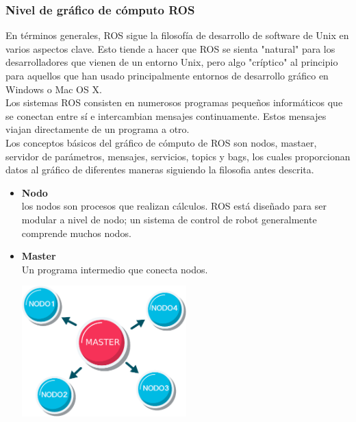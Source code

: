 \subsubsection{Nivel de gráfico de cómputo ROS}
En términos generales, ROS sigue la filosofía de desarrollo de software de Unix 
en varios aspectos clave. Esto tiende a hacer que ROS se sienta "natural" para los 
desarrolladores que vienen de un entorno Unix, pero algo "críptico" al principio 
para aquellos que han usado principalmente entornos de desarrollo gráfico en 
Windows o Mac OS X.~\cite{ROSMIKE}\\
Los sistemas ROS consisten en numerosos programas pequeños informáticos que se 
conectan entre sí e intercambian mensajes continuamente. Estos mensajes viajan 
directamente de un programa a otro.\\
Los conceptos básicos del gráfico de cómputo de ROS son nodos, mastaer, 
servidor de parámetros, mensajes, servicios, topics y bags, los cuales 
proporcionan datos al gráfico de diferentes maneras siguiendo la filosofia
antes descrita.
\begin{itemize}
    \item \textbf{Nodo}\\
    los nodos son procesos que realizan cálculos. ROS está diseñado para ser modular 
    a nivel de nodo; un sistema de control de robot generalmente comprende muchos nodos.
    \item \textbf{Master}\\
    Un programa intermedio que conecta nodos.
    \begin{center}
        \includegraphics[width=0.5\textwidth]{Capitulo2/Fig2.eps}       
        \label{Fig2}
    \end{center}
    
\end{itemize}